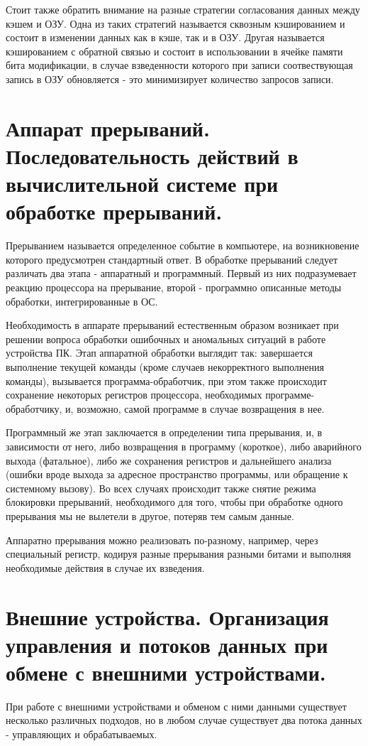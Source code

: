 \documentclass[a4paper,12pt,titlepage,finall]{article}
\begin{document}
Стоит также обратить внимание на разные стратегии согласования данных между кэшем и ОЗУ. Одна из таких стратегий называется сквозным кэшированием и состоит в изменении данных как в кэше, так и в ОЗУ. Другая называется кэшированием с обратной связью и состоит в использовании в ячейке памяти бита модификации, в случае взведенности которого при записи соотвествующая запись в ОЗУ обновляется - это минимизирует количество запросов записи.

\section{Аппарат прерываний. Последовательность действий в
вычислительной системе при обработке прерываний.}
Прерыванием называется определенное событие в компьютере, на возникновение которого предусмотрен стандартный ответ. В обработке прерываний следует различать два этапа - аппаратный и программный. Первый из них подразумевает реакцию процессора на прерывание, второй - программно описанные методы обработки, интегрированные в ОС.

Необходимость в аппарате прерываний естественным образом возникает при решении вопроса обработки ошибочных и аномальных ситуаций в работе устройства ПК. Этап аппаратной обработки выглядит так: завершается выполнение текущей команды (кроме случаев некорректного выполнения команды), вызывается программа-обработчик, при этом также происходит сохранение некоторых регистров процессора, необходимых программе-обработчику, и, возможно, самой программе в случае возвращения в нее. 

Программный же этап заключается в определении типа прерывания, и, в зависимости от него, либо возвращения в программу (короткое), либо аварийного выхода (фатальное), либо же сохранения регистров и дальнейшего анализа (ошибки вроде выхода за адресное пространство программы, или обращение к системному вызову). Во всех случаях происходит также снятие режима блокировки прерываний, необходимого для того, чтобы при обработке одного прерывания мы не вылетели в другое, потеряв тем самым данные.

Аппаратно прерывания можно реализовать по-разному, например, через специальный регистр, кодируя разные прерывания разными битами и выполняя необходимые действия в случае их взведения.

\section{Внешние устройства. Организация управления и потоков
данных при обмене с внешними устройствами.}
При работе с внешними устройствами и обменом с ними данными существует несколько различных подходов, но в любом случае существует два потока данных - управляющих и обрабатываемых.
\end{document}
